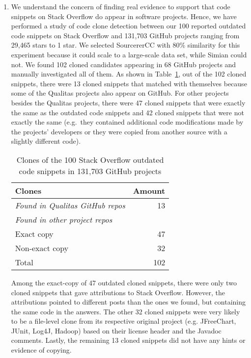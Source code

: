 \documentclass[a4paper,twoside,10pt]{reviewresponse}
\begin{document}
\begin{enumerate}
	\item We understand the concern of finding real evidence to support that code snippets on Stack Overflow do appear in software projects. Hence, we have performed a study of code clone detection between our 100 reported outdated code snippets on Stack Overflow and 131,703 GitHub projects ranging from 29,465 stars to 1 star. We selected SourcererCC with 80\% similarity for this experiment because it could scale to a large-scale data set, while Simian could not. We found 102 cloned candidates appearing in 68 GitHub projects and manually investigated all of them. As shown in Table~\ref{tab:outdated_github}, out of the 102 cloned snippets, there were 13 cloned snippets that matched with themselves because some of the Qualitas projects also appear on GitHub. For other projects besides the Qualitas projects, there were 47 cloned snippets that were exactly the same as the outdated code snippets and 42 cloned snippets that were not exactly the same (e.g.~they contained additional code modifications made by the projects' developers or they were copied from another source with a slightly different code). 
	
	\begin{table}[H]
		\centering
		\caption{Clones of the 100 Stack Overflow outdated code snippets in 131,703 GitHub projects}
		\label{tab:outdated_github}
		\begin{tabular}{lr}
			\toprule
			Clones & Amount \\
			\midrule
			\textit{Found in Qualitas GitHub repos} & 13 \\
			\midrule
			\textit{Found in other project repos} & \\
			Exact copy & 47 \\
			Non-exact copy & 32 \\
			\midrule
			Total & 102 \\
			\bottomrule
		\end{tabular}
	\end{table}

	Among the exact-copy of 47 outdated cloned snippets, there were only two cloned snippets that gave attributions to Stack Overflow. However, the attributions pointed to different posts than the ones we found, but containing the same code in the answers. The other 32 cloned snippets were very likely to be a file-level clone from its respective original project (e.g. JFreeChart, JUnit, Log4J, Hadoop) based on their license header and the Javadoc comments. Lastly, the remaining 13 cloned snippets did not have any hints or evidence of copying.
	

\end{enumerate}
\end{document}
